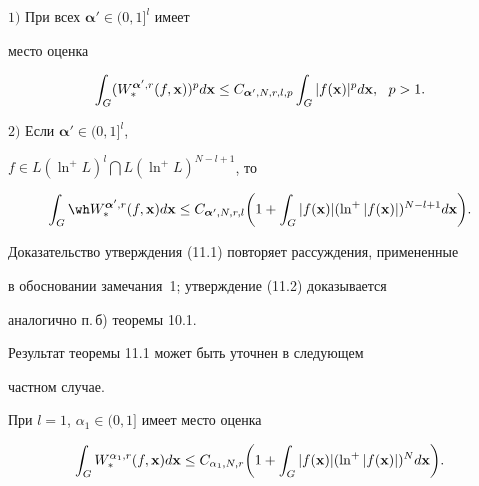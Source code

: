 \begin{thms}


$1)$ При всех ${\boldsymbol {\alpha}}'\in (0,1]^l$ имеет


место оценка


\begin{equation}


\int_G(W_{*}^{{\boldsymbol {\alpha}}',r}(f,{\bold x}))^p


d{\bold x}\le C_{{\boldsymbol {\alpha}}',N,r,l,p}


\int_G |f ( {\bold x})|^p d{\bold x},\ \ p>1.


\end{equation}





$2)$ Если ${\boldsymbol {\alpha}}'\in (0,1]^l$,


$f\in L(\ln^+L)^l\bigcap L(\ln^+L)^{N-l+1}$, то


\begin{equation}


\int_G \wh W_{*}^{{\boldsymbol {\alpha}}',r} (f,{\bold x})


d{\bold x}\le C_{{\boldsymbol {\alpha}}',N,r,l}


\bigg(1+\int_G |f({\bold x})|(\ln^+ |f ( {\bold x})|)^{N-l+1} d{\bold x}\bigg).


\end{equation}


\end{thms}





Доказательство утверждения (11.1) повторяет рассуждения, примененные


в обосновании замечания~1; утверждение (11.2) доказывается


аналогично п.\,б) теоремы 10.1.





Результат теоремы 11.1 может быть уточнен в следующем 


частном случае.








\begin{thms}


При $l=1$, $\alpha_1\in (0,1]$ имеет место оценка


\begin{equation}


\int_G W_{*}^{\alpha_1,r} (f,{\bold x}) d{\bold x}\le C_{\alpha_1,N,r}


\bigg(1+\int_G |f({\bold x})|(\ln^+ |f ( {\bold x})|)^{N} d{\bold x}\bigg).


\end{equation}


\end{thms}





